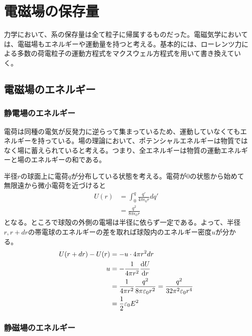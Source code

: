 \section{電磁場の保存量}

力学において、系の保存量は全て粒子に帰属するものだった。電磁気学においては、電磁場もエネルギーや運動量を持つと考える。基本的には、ローレンツ力による多数の荷電粒子の運動方程式をマクスウェル方程式を用いて書き換えていく。

\subsection{電磁場のエネルギー}
    \subsubsection{静電場のエネルギー}
        電荷は同種の電気が反発力に逆らって集まっているため、運動していなくてもエネルギーを持っている。場の理論において、ポテンシャルエネルギーは物質ではなく場に蓄えられていると考える。つまり、全エネルギーは物質の運動エネルギーと場のエネルギーの和である。

        半径$r$の球面上に電荷$q$が分布している状態を考える。電荷が0の状態から始めて無限遠から微小電荷を近づけると
        \begin{align*}
            U(r)
                &= \int_0^q \frac{q'}{4\pi\epsilon_0 r} dq'\\
                &= \frac{q^2}{8\pi\epsilon_0 r}
        \end{align*}
        となる。ところで球殻の外側の電場は半径に依らず一定である。よって、半径$r, r + dr$の帯電球のエネルギーの差を取れば球殻内のエネルギー密度$u$が分かる。
        \begin{align*}
            U(r + dr) - U(r) &= -u \cdot 4\pi r^2dr\\
            u &= -\frac{1}{4\pi r^2}\dv{U}{r}\\
            &= \frac{1}{4\pi r^2}\frac{q^2}{8\pi\varepsilon_0 r^2} = \frac{q^2}{32\pi^2\varepsilon_0 r^4}\\
            &= \frac{1}{2}\varepsilon_0 E^2
        \end{align*}

    \subsubsection{静磁場のエネルギー}
